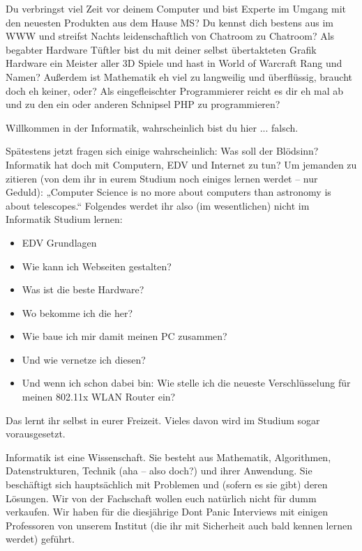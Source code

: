 
Du verbringst viel Zeit vor deinem Computer und bist Experte im Umgang mit den neuesten Produkten aus dem Hause MS? Du kennst dich bestens aus im WWW und streifst Nachts leidenschaftlich von Chatroom zu Chatroom? Als begabter Hardware Tüftler bist du mit deiner selbst übertakteten Grafik Hardware ein Meister aller 3D Spiele und hast in World of Warcraft Rang und Namen? Außerdem ist Mathematik eh viel zu langweilig und überflüssig, braucht doch eh keiner, oder? Als eingefleischter Programmierer reicht es dir eh mal ab und zu den ein oder anderen Schnipsel PHP zu programmieren?

Willkommen in der Informatik, wahrscheinlich bist du hier ... falsch.


Spätestens jetzt fragen sich einige wahrscheinlich: Was soll der Blödsinn? Informatik hat doch mit Computern, EDV und Internet zu tun? Um jemanden zu zitieren (von dem ihr in eurem Studium noch einiges lernen werdet – nur Geduld): „Computer Science is no more about computers than astronomy is about telescopes.“ Folgendes werdet ihr also (im wesentlichen) nicht im Informatik Studium lernen:

\begin{itemize}
     \item EDV Grundlagen
     \item Wie kann ich Webseiten gestalten?
     \item Was ist die beste Hardware?
     \item Wo bekomme ich die her?
     \item Wie baue ich mir damit meinen PC zusammen?
     \item Und wie vernetze ich diesen?
     \item Und wenn ich schon dabei bin: Wie stelle ich die neueste Verschlüsselung für meinen 802.11x WLAN Router ein?
\end{itemize}

Das lernt ihr selbst in eurer Freizeit. Vieles davon wird im Studium sogar vorausgesetzt.

Informatik ist eine Wissenschaft. Sie besteht aus Mathematik, Algorithmen, Datenstrukturen, Technik (aha – also doch?) und ihrer Anwendung. Sie beschäftigt sich hauptsächlich mit Problemen und (sofern es sie gibt) deren Lösungen. Wir von der Fachschaft wollen euch natürlich nicht für dumm verkaufen. Wir haben für die diesjährige Dont Panic Interviews mit einigen Professoren von unserem Institut (die ihr mit Sicherheit auch bald kennen lernen werdet) geführt.



